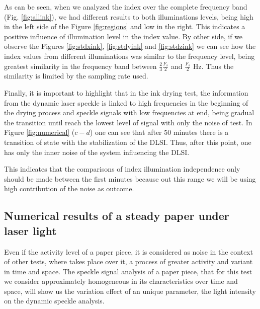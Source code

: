 \documentclass[review]{elsarticle}
\begin{document}
As can be seen, when we analyzed the index over the complete frequency band (Fig. \ref{fig:allink}),
we had different results to both illuminations levels, being high in the left side of the Figure \ref{fig:regions} and low in the right. This 
indicates a positive influence of illumination level in the index value.
By other side, if we observe the Figures \ref{fig:stdxink}, \ref{fig:stdyink} and \ref{fig:stdzink}
we can see how the index values from different
illuminations  was similar to the frequency level,
being greatest similarity in the frequency band between $\frac{2}{3}\frac{F_s}{2}$ and $\frac{F_s}{2}$ Hz.
Thus the similarity is limited by the sampling rate used.

Finally, it is important to highlight that in the ink drying test, the information from the dynamic laser speckle is linked to high frequencies in the beginning of the drying process and  speckle signals with low frequencies at end, being gradual the transition
until reach the lowest level of signal with only the noise of test.
In Figure \ref{fig:numerical} ($c-d$) one can see that after 50 minutes there is a transition of state with the stabilization of the DLSI. Thus, after this point, one has only the inner noise of the system influencing the DLSI.

This indicates that the comparisons of index illumination independence
only should be made between the first minutes because out this range we will be using high contribution of 
the noise as outcome.

\subsection{Numerical results of a steady paper under laser light} 
\label{subsec:numericalpaper}


Even if the activity level of a paper piece, 
it  is considered as noise in the context of other tests, where takes place over it, 
a process of greater activity and variant in time and space. 
The speckle signal analysis of a paper piece, 
that for this test we consider approximately homogeneous in its characteristics over time and space,
will show us  the variation effect of an unique parameter, the light intensity on the dynamic speckle analysis.
\end{document}
